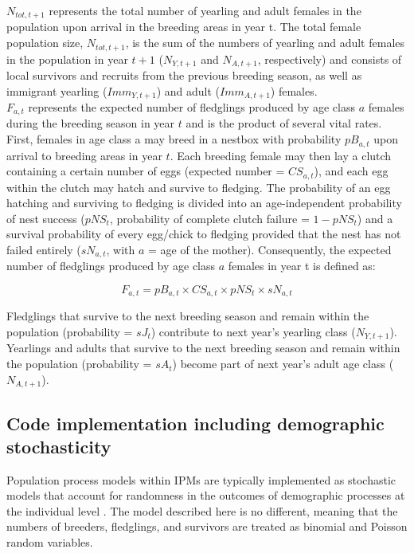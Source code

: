 \documentclass[
]{book}
\begin{document}
\(N_{tot,t+1}\) represents the total number of yearling and adult females in the
population upon arrival in the breeding areas in year t. The total female
population size, \(N_{tot,t+1}\), is the sum of the numbers of yearling and adult
females in the population in year \(t+1\) (\(N_{Y,t+1}\) and \(N_{A,t+1}\),
respectively) and consists of local survivors and recruits from the previous
breeding season, as well as immigrant yearling (\(Imm_{Y,t+1}\)) and adult
(\(Imm_{A,t+1}\)) females.\\

\(F_{a,t}\) represents the expected number of fledglings produced by age class \(a\)
females during the breeding season in year \(t\) and is the product of several
vital rates. First, females in age class a may breed in a nestbox with
probability \(pB_{a,t}\) upon arrival to breeding areas in year \(t\). Each breeding
female may then lay a clutch containing a certain number of eggs (expected
number = \(CS_{a,t}\)), and each egg within the clutch may hatch and survive to
fledging. The probability of an egg hatching and surviving to fledging is
divided into an age-independent probability of nest success (\(pNS_t\),
probability of complete clutch failure = \(1-pNS_t\)) and a survival probability
of every egg/chick to fledging provided that the nest has not failed entirely
(\(sN_{a,t}\), with \(a\) = age of the mother). Consequently, the expected number of
fledglings produced by age class \(a\) females in year t is defined as:

\begin{equation}
F_{a,t}= pB_{a,t}\times CS_{a,t}\times pNS_{t}\times sN_{a,t}
\end{equation}

Fledglings that survive to the next breeding season and remain within the
population (probability = \(sJ_t\)) contribute to next year's yearling class
(\(N_{Y,t+1}\)). Yearlings and adults that survive to the next breeding season and
remain within the population (probability = \(sA_t\)) become part of next year's
adult age class (\(N_{A,t+1}\)).

\hypertarget{code-implementation-including-demographic-stochasticity}{%
\subsection{Code implementation including demographic stochasticity}\label{code-implementation-including-demographic-stochasticity}}

Population process models within IPMs are typically implemented as stochastic
models that account for randomness in the outcomes of demographic processes at
the individual level \citep[``demographic stochasticity'',][]{Caswell2001, kery2011}.
The model described here is no different, meaning that the numbers of breeders,
fledglings, and survivors are treated as binomial and Poisson random variables.
\end{document}

